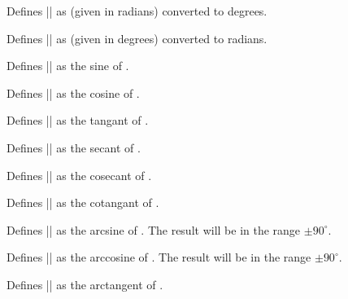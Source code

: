 \begin{command}{} 
	Defines |\pgfmathresult| as  (given in radians) converted to 
	degrees. 
\end{command}

\begin{command}{} 
	Defines |\pgfmathresult| as  (given in degrees) converted to 
	radians. 
\end{command}

\begin{command}{}  
	Defines |\pgfmathresult| as the sine of .  
\end{command}

\begin{command}{}
	Defines |\pgfmathresult| as the cosine of .
\end{command}

\begin{command}{}  
	Defines |\pgfmathresult| as the tangant of .  
\end{command}

\begin{command}{}
	Defines |\pgfmathresult| as the secant of .
\end{command}

\begin{command}{}  
	Defines |\pgfmathresult| as the cosecant of .  
\end{command}

\begin{command}{}  
	Defines |\pgfmathresult| as the cotangant of .  
\end{command}

\begin{command}{}
	Defines |\pgfmathresult| as the arcsine of . 
	The result will be in the range $\pm90^\circ$.
\end{command}

\begin{command}{}
	Defines |\pgfmathresult| as the arccosine of .
	The result will be in the range $\pm90^\circ$.
\end{command}

\begin{command}{}
 	Defines |\pgfmathresult| as the arctangent of .
\end{command}



